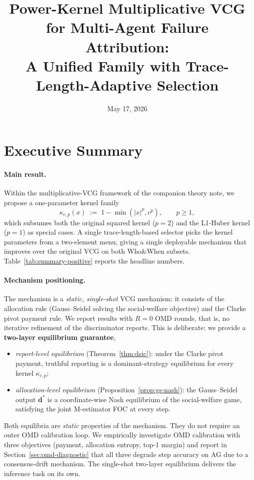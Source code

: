 \documentclass[11pt]{article}
\title{Power-Kernel Multiplicative VCG for Multi-Agent Failure Attribution:\\
{\large A Unified Family with Trace-Length-Adaptive Selection}}
\author{}
\date{May 17, 2026}
\newcommand{\db}{\bm{d}}
\begin{document}
\maketitle

\section*{Executive Summary}

\paragraph{Main result.}
Within the multiplicative-VCG framework of the companion theory note, we
propose a one-parameter kernel family
\[
\kappa_{c, p}(x) \;:=\; 1 - \min(|x|^p, c^p), \qquad p \geq 1,
\]
which subsumes both the original squared kernel ($p = 2$) and the L1-Huber
kernel ($p = 1$) as special cases. A single trace-length-based selector
picks the kernel parameters from a two-element menu, giving a single
deployable mechanism that improves over the original VCG on both Who\&When
subsets. Table~\ref{tab:summary-positive} reports the headline numbers.

\paragraph{Mechanism positioning.}
The mechanism is a \emph{static, single-shot} VCG mechanism: it consists of
the allocation rule (Gauss--Seidel solving the social-welfare objective)
and the Clarke pivot payment rule. We report results with $R = 0$ OMD
rounds, that is, no iterative refinement of the discriminator reports.
This is deliberate: we provide a \textbf{two-layer equilibrium guarantee},
\begin{itemize}[nosep, leftmargin=*]
\item \emph{report-level equilibrium} (Theorem~\ref{thm:dsic}): under the
Clarke pivot payment, truthful reporting is a dominant-strategy equilibrium
for every kernel $\kappa_{c, p}$;
\item \emph{allocation-level equilibrium} (Proposition~\ref{prop:gs-nash}):
the Gauss--Seidel output $\db^*$ is a coordinate-wise Nash equilibrium of
the social-welfare game, satisfying the joint M-estimator FOC at every step.
\end{itemize}
Both equilibria are \emph{static} properties of the mechanism. They do not
require an outer OMD calibration loop. We empirically investigate OMD
calibration with three objectives (payment, allocation entropy, top-1
margin) and report in Section~\ref{sec:omd-diagnostic} that all three
degrade step accuracy on AG due to a consensus-drift mechanism. The
single-shot two-layer equilibrium delivers the inference task on its own.
\end{document}
